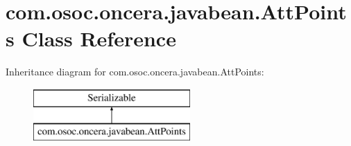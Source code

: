 \hypertarget{classcom_1_1osoc_1_1oncera_1_1javabean_1_1_att_points}{}\section{com.\+osoc.\+oncera.\+javabean.\+Att\+Points Class Reference}
\label{classcom_1_1osoc_1_1oncera_1_1javabean_1_1_att_points}
Inheritance diagram for com.\+osoc.\+oncera.\+javabean.\+Att\+Points\+:\begin{figure}[H]
\begin{center}
\leavevmode
\includegraphics[height=2.000000cm]{classcom_1_1osoc_1_1oncera_1_1javabean_1_1_att_points}
\end{center}
\end{figure}
